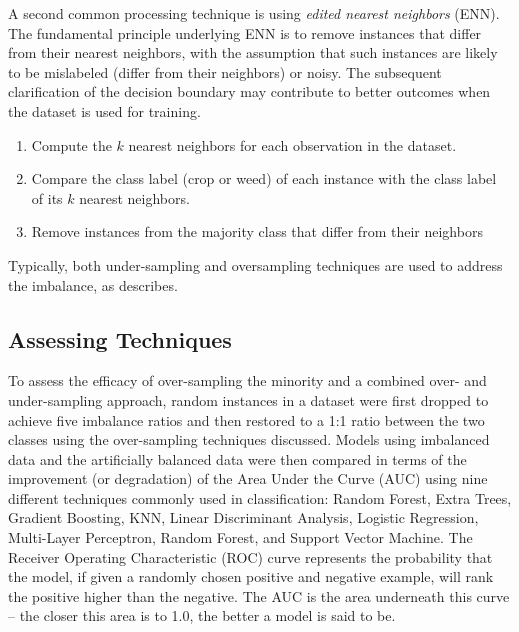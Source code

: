 \documentclass[letterpaper]{report}
\begin{document}
A second common processing technique is using \textit{edited nearest neighbors} (ENN). The fundamental principle underlying ENN is to remove instances that differ from their nearest neighbors, with the assumption that such instances are likely to be mislabeled (differ from their neighbors) or noisy. The subsequent clarification of the decision boundary may contribute to better outcomes when the dataset is used for training.
\begin{enumerate}
\item{Compute the $k$ nearest neighbors for each observation in the dataset.}
\item{Compare the class label (crop or weed) of each instance with the class label of its $k$ nearest neighbors.}
\item{Remove instances from the majority class that differ from their neighbors}
\end{enumerate}

Typically, both under-sampling and oversampling techniques are used to address the imbalance, as \citeauthor{Batista2004-qz} \citeyear{Batista2004-qz} describes. 

\subsection{Assessing Techniques}
To assess the efficacy of over-sampling the minority and a combined over- and under-sampling approach, random instances in a dataset were first dropped to achieve five imbalance ratios and then restored to a 1:1 ratio between the two classes using the over-sampling techniques discussed. Models using imbalanced data and the artificially balanced data were then compared in terms of the improvement (or degradation) of the Area Under the Curve (AUC) using nine different techniques commonly used in classification: Random Forest, Extra Trees, Gradient Boosting, KNN, Linear Discriminant Analysis, Logistic Regression, Multi-Layer Perceptron, Random Forest, and Support Vector Machine. The Receiver Operating Characteristic (ROC) curve represents the probability that the model, if given a randomly chosen positive and negative example, will rank the positive higher than the negative. The AUC is the area underneath this curve -- the closer this area is to 1.0, the better a model is said to be.
\end{document}
